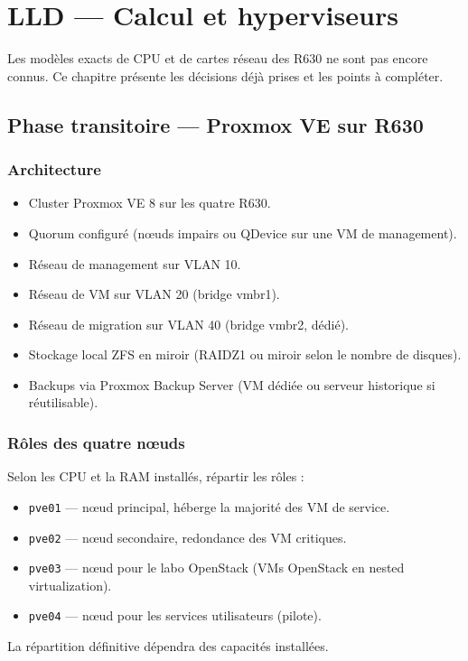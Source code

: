 \chapter{LLD — Calcul et hyperviseurs}
\label{chap:compute}

\begin{todobox}
Les modèles exacts de CPU et de cartes réseau des R630 ne sont pas encore connus. Ce chapitre présente les décisions déjà prises et les points à compléter.
\end{todobox}

\section{Phase transitoire — Proxmox VE sur R630}
\subsection{Architecture}
\begin{itemize}
  \item Cluster Proxmox VE 8 sur les quatre R630.
  \item Quorum configuré (nœuds impairs ou QDevice sur une VM de management).
  \item Réseau de management sur VLAN 10.
  \item Réseau de VM sur VLAN 20 (bridge vmbr1).
  \item Réseau de migration sur VLAN 40 (bridge vmbr2, dédié).
  \item Stockage local ZFS en miroir (RAIDZ1 ou miroir selon le nombre de disques).
  \item Backups via Proxmox Backup Server (VM dédiée ou serveur historique si réutilisable).
\end{itemize}

\subsection{Rôles des quatre nœuds}
\begin{todobox}
Selon les CPU et la RAM installés, répartir les rôles :
\begin{itemize}
  \item \texttt{pve01} — nœud principal, héberge la majorité des VM de service.
  \item \texttt{pve02} — nœud secondaire, redondance des VM critiques.
  \item \texttt{pve03} — nœud pour le labo OpenStack (VMs OpenStack en nested virtualization).
  \item \texttt{pve04} — nœud pour les services utilisateurs (pilote).
\end{itemize}
La répartition définitive dépendra des capacités installées.
\end{todobox}

